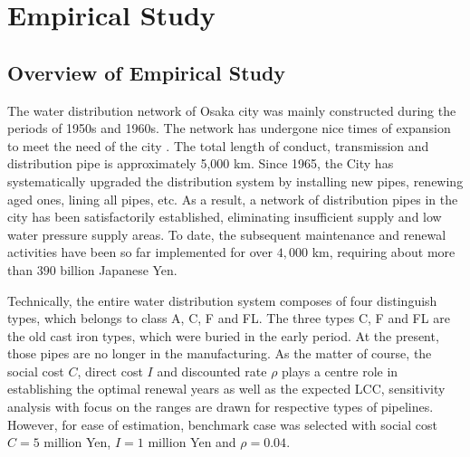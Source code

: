 \documentclass[a4paper,oneside,onecolumn,preprint,10pt,authoryear]{elsarticle}
\begin{document}
\section{Empirical Study}
\label{58}
\subsection{Overview of Empirical Study}
\label{581}
The water distribution network of Osaka city was mainly constructed during the periods of 1950s and 1960s. The network has undergone nice times of expansion to meet the need of the city \cite{osaka}. The total length of conduct, transmission and distribution pipe is approximately 5,000 km. Since 1965, the City has systematically upgraded the distribution system by installing new pipes, renewing aged ones, lining all pipes, etc. As a result, a network of distribution pipes in the city has been satisfactorily established, eliminating insufficient supply and low water pressure supply areas. To date, the subsequent maintenance and renewal activities have been so far implemented for over $4,000$ km, requiring about more than $390$ billion Japanese Yen.

Technically, the entire water distribution system composes of four distinguish types, which belongs to class A, C, F and FL. The three types C, F and FL are the old cast iron types, which were buried in the early period. At the present, those pipes are no longer in the manufacturing. %
As the matter of course, the social cost $C$, direct cost $I$ and discounted rate $\rho$ plays a centre role in establishing the optimal renewal years as well as the expected LCC, sensitivity analysis with focus on the ranges are drawn for respective types of pipelines. However, for ease of estimation, benchmark case was selected with social cost $C=5$ million Yen, $I =1$ million Yen and $\rho=0.04$.
\end{document}
